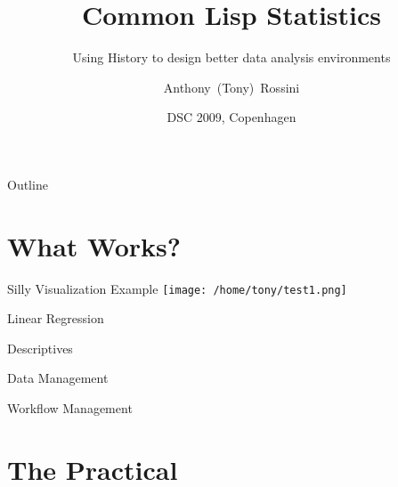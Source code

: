 \documentclass{beamer}
\title[CLS]{Common Lisp Statistics}
\subtitle{Using History to design better data analysis environments}
\author[Rossini]{Anthony~(Tony)~Rossini}
\institute[Novartis and University of Washington] %
{
  Group Head, Modeling and Simulation\\
  Novartis Pharma AG, Switzerland
  \and
  Affiliate Assoc Prof, Biomedical and Health Informatics\\
  University of Washington, USA}
\date[DSC2009]{DSC 2009, Copenhagen}
\begin{document}
\begin{frame}
  \titlepage
\end{frame}

\begin{frame}{Outline}
  \tableofcontents
\end{frame}




\section{What Works?}

\begin{frame}{Silly Visualization Example}
\texttt{[image: /home/tony/test1.png]}
\end{frame}


\begin{frame}{Linear Regression}
  
\end{frame}


\begin{frame}{Descriptives}
  
\end{frame}

\begin{frame}{Data Management}
  
\end{frame}


\begin{frame}{Workflow Management}
  
\end{frame}


\section{The Practical}
\label{sec:practice}
\end{document}
